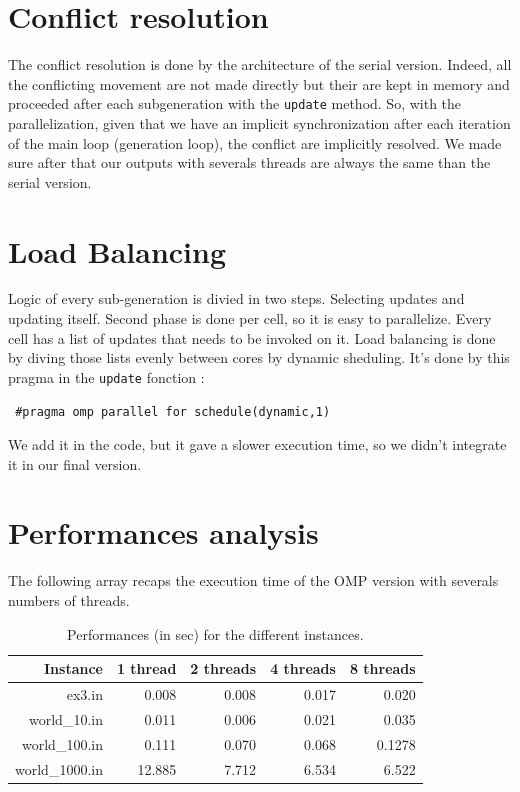 \documentclass[a4paper,10pt]{article}
\begin{document}
\section*{Conflict resolution}

The conflict resolution is done by the architecture of the serial version. Indeed, all the conflicting movement are not made
directly but their are kept in memory and proceeded after each subgeneration with the \texttt{update} method.
So, with the parallelization, given that we have an implicit synchronization after each iteration of the main loop (generation loop),
the conflict are implicitly resolved. We made sure after that our outputs with severals threads are always the same than the serial version.

\section*{Load Balancing}
Logic of every sub-generation is divied in two steps. 
Selecting updates and updating itself. 
Second phase is done per cell, so it is easy to parallelize. 
Every cell has a list of updates that needs to be invoked on it. 
Load balancing is done by diving those lists evenly between cores by dynamic sheduling. It's done by this pragma
in the \texttt{update} fonction :

\begin{lstlisting}
 #pragma omp parallel for schedule(dynamic,1)
\end{lstlisting}

We add it in the code, but it gave a slower execution time, so we didn't integrate it in our final version.

\section*{Performances analysis}

The following array recaps the execution time of the OMP version with severals numbers of threads.
\begin{table}[!ht]
\centering
\begin{tabular}{|r||r|r|r|r|}
  \hline
    Instance     & 1 thread   & 2 threads   & 4 threads  & 8 threads  \\
  \hline
    ex3.in       &  0.008     & 0.008        & 0.017       &  0.020 \\ 
  \hline
    world\_10.in &  0.011      &  0.006       & 0.021       & 0.035 \\ 
  \hline
   world\_100.in &  0.111      & 0.070        & 0.068      & 0.1278 \\ 
  \hline
  world\_1000.in &  12.885   & 7.712       & 6.534      &  6.522 \\ 
  \hline
\end{tabular}
\caption{Performances (in sec) for the different instances.}
\end{table}
\end{document}
